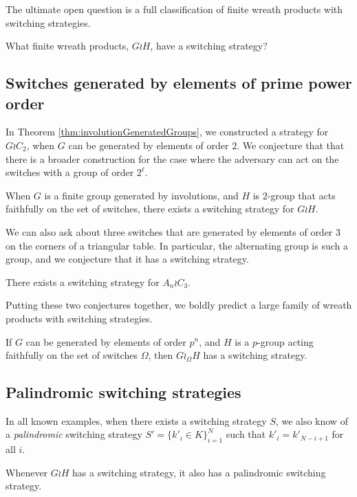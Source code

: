 The ultimate open question is a full classification
of finite wreath products with switching strategies.
\begin{openquestion}
  What finite wreath products, $G \wr H$, have a switching strategy?
\end{openquestion}
\subsection{Switches generated by elements of prime power order}

In Theorem \ref{thm:involutionGeneratedGroups},
we constructed a strategy for $G \wr C_2$,
when $G$ can be generated by elements of order $2$.
We conjecture that that there is a broader construction for the case where
the adversary can act on the switches with a group of order $2^\ell$.

\begin{conjecture}
  When $G$ is a finite group generated by involutions, and
  $H$ is $2$-group that acts faithfully on the set of switches,
  there exists a switching strategy for $G \wr H$.
\end{conjecture}

We can also ask about three switches that are generated by elements of order
$3$ on the corners of a triangular table. In particular, the alternating group
is such a group, and we conjecture that it has a switching strategy.

\begin{conjecture}
  There exists a switching strategy for $A_n \wr C_3$.
\end{conjecture}

Putting these two conjectures together, we boldly predict a large family
of wreath products with switching strategies.
\begin{conjecture}
  If $G$ can be generated by elements of order $p^n$, and $H$ is a $p$-group
  acting faithfully on the set of switches $\Omega$, then $G \wr_\Omega H$ has
  a switching strategy.
\end{conjecture}

\subsection{Palindromic switching strategies}
In all known examples, when there exists a switching strategy $S$,
we also know of a \textit{palindromic} switching strategy
$S' = \{k'_i \in K\}_{i=1}^N$
such that $k'_i = k'_{N-i+1}$ for all $i$.

\begin{conjecture}
  Whenever $G \wr H$ has a switching strategy, it also has a palindromic switching
  strategy.
\end{conjecture}


